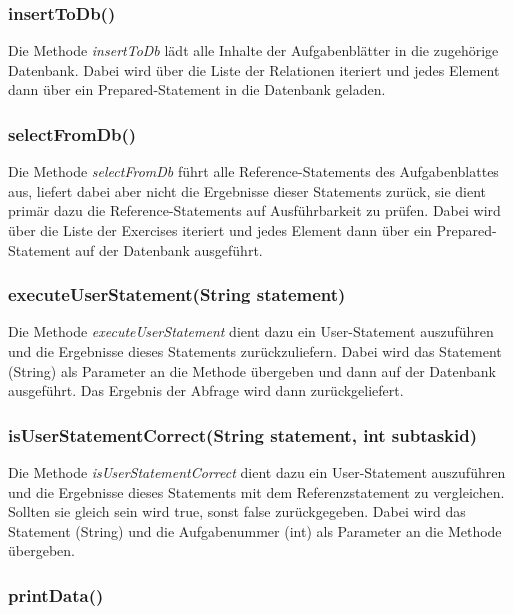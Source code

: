 \documentclass[11pt]{report}
\begin{document}
\subsubsection*{insertToDb()}

Die Methode \textit{insertToDb} lädt alle Inhalte der Aufgabenblätter in die zugehörige Datenbank. 
Dabei wird über die Liste der Relationen iteriert und jedes Element dann über ein Prepared-Statement in die Datenbank geladen.

\subsubsection*{selectFromDb()}

Die Methode \textit{selectFromDb} führt alle Reference-Statements des Aufgabenblattes aus, liefert dabei aber nicht die Ergebnisse dieser Statements zurück, sie dient primär dazu die Reference-Statements auf Ausführbarkeit zu prüfen.
Dabei wird über die Liste der Exercises iteriert und jedes Element dann über ein Prepared-Statement auf der Datenbank ausgeführt.

\subsubsection*{executeUserStatement(String statement)}

Die Methode \textit{executeUserStatement} dient dazu ein User-Statement auszuführen und die Ergebnisse dieses Statements zurückzuliefern.
Dabei wird das Statement (String) als Parameter an die Methode übergeben und dann auf der Datenbank ausgeführt. Das Ergebnis der Abfrage wird dann zurückgeliefert.

\subsubsection*{isUserStatementCorrect(String statement, int subtaskid) }

Die Methode \textit{isUserStatementCorrect} dient dazu ein User-Statement auszuführen und die Ergebnisse dieses Statements mit dem Referenzstatement zu vergleichen. Sollten sie gleich sein wird true, sonst false zurückgegeben.
Dabei wird das Statement (String) und die Aufgabenummer (int) als Parameter an die Methode übergeben.

\subsubsection*{printData()}
\end{document}
